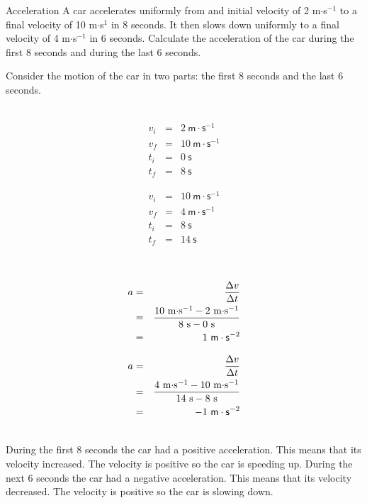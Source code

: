 \begin{wex}{Acceleration}
{A car accelerates uniformly from and initial velocity of 2 m$\cdot$s$^{-1}$ to a final velocity of 10 m$\cdot$s$^1$ in 8 seconds. It then slows down uniformly to a final velocity of 4 m$\cdot$s$^{-1}$ in 6 seconds. Calculate the acceleration of the car during the first 8 seconds and during the last 6 seconds.}
{
Consider the motion of the car in two parts: the first 8 seconds and the last 6 seconds.\\
\\
\begin{minipage}{0.5\textwidth}
\begin{eqnarray*}
v_i &=& 2~\mathsf{m}\cdot \mathsf{s}^{-1}\\
v_f &=& 10~\mathsf{m}\cdot \mathsf{s}^{-1}\\
t_i &=& 0~\mathsf{s}\\
t_f &=& 8~\mathsf{s}
\end{eqnarray*}
\end{minipage}
\begin{minipage}{0.5\textwidth}
\begin{eqnarray*}
v_i &=& 10~\mathsf{m}\cdot \mathsf{s}^{-1}\\
v_f &=& 4~\mathsf{m}\cdot \mathsf{s}^{-1}\\
t_i &=& 8~\mathsf{s}\\
t_f &=& 14~\mathsf{s}
\end{eqnarray*}
\end{minipage}\\

\begin{minipage}{0.5\textwidth}
\begin{eqnarray*}
a &=& \frac{\Delta v}{\Delta t}\\
&=& \frac{10\textrm{ m$\cdot$s$^{-1}$} - 2\textrm{ m$\cdot$s$^{-1}$}}{8\textrm{ s} - 0\textrm{ s}}\\
&=& 1~\mathsf{m}\cdot \mathsf{s}^{-2}
\end{eqnarray*}
\end{minipage}
\begin{minipage}{0.5\textwidth}
\begin{eqnarray*}
a &=& \frac{\Delta v}{\Delta t}\\
&=& \frac{4\textrm{ m$\cdot$s$^{-1}$} - 10\textrm{ m$\cdot$s$^{-1}$}}{14\textrm{ s} - 8\textrm{ s}}\\
&=& -1~\mathsf{m}\cdot \mathsf{s}^{-2}
\end{eqnarray*}
\end{minipage}\\
During the first 8 seconds the car had a positive acceleration. This means that its velocity increased. The velocity is positive so the car is speeding up.
During the next 6 seconds the car had a negative acceleration. This means that its velocity decreased. The velocity is positive so the car is slowing down.}
\end{wex}
